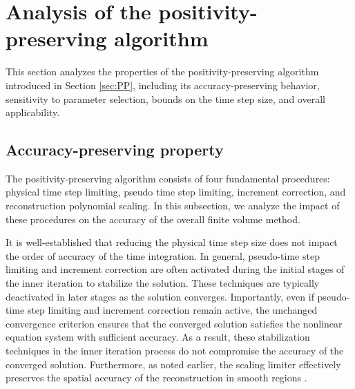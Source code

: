 \begingroup
\color{r2color}

\section{Analysis of the positivity-preserving algorithm}

This section analyzes the properties of the positivity-preserving algorithm introduced in Section \ref{sec:PP}, including its accuracy-preserving behavior, sensitivity to parameter selection, bounds on the time step size, and overall applicability.

\subsection{Accuracy-preserving property}

The positivity-preserving algorithm consists of four fundamental procedures: physical time step limiting, pseudo time step limiting, increment correction, and reconstruction polynomial scaling. In this subsection, we analyze the impact of these procedures on the accuracy of the overall finite volume method.

It is well-established that reducing the physical time step size does not impact the order of accuracy of the time integration.
In general, pseudo-time step limiting and increment correction are often activated during the initial stages of the inner iteration to stabilize the solution. These techniques are typically deactivated in later stages as the solution converges. Importantly, even if pseudo-time step limiting and increment correction remain active, the unchanged convergence criterion ensures that the converged solution satisfies the nonlinear equation system with sufficient accuracy. As a result, these stabilization techniques in the inner iteration process do not compromise the accuracy of the converged solution.
Furthermore, as noted earlier, the scaling limiter effectively preserves the 
spatial accuracy of the reconstruction in smooth regions \cite{zhang2010positivity}.

